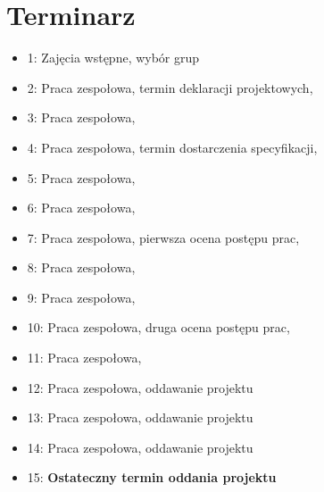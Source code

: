 \documentclass{article}
\begin{document}
	\section{Terminarz}
	\begin{itemize}
		\item 1: Zajęcia wstępne, wybór grup
		\item 2: Praca zespołowa, termin deklaracji projektowych,
		\item 3: Praca zespołowa,
		\item 4: Praca zespołowa, termin dostarczenia specyfikacji,
		\item 5: Praca zespołowa,
		\item 6: Praca zespołowa,
		\item 7: Praca zespołowa, pierwsza ocena postępu prac,
		\item 8: Praca zespołowa,
		\item 9: Praca zespołowa,
		\item 10: Praca zespołowa, druga ocena postępu prac,
		\item 11: Praca zespołowa,
		\item 12: Praca zespołowa, oddawanie projektu
		\item 13: Praca zespołowa, oddawanie projektu
		\item 14: Praca zespołowa, oddawanie projektu
		\item 15: \textbf{Ostateczny termin oddania projektu}
	\end{itemize}
\end{document}
